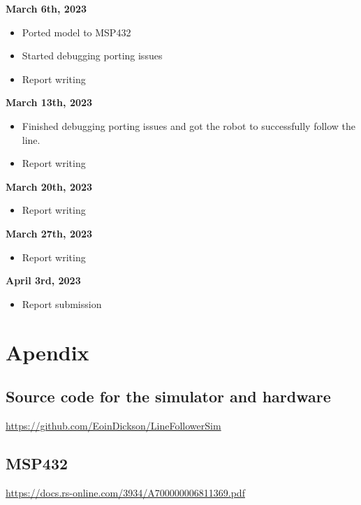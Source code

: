 \documentclass[a4paper,12pt]{article}
\begin{document}
\textbf{\large March 6th, 2023}
\begin{itemize}
  \item Ported model to MSP432 
  \item Started debugging porting issues
  \item Report writing 


\end{itemize}
\vspace{.7cm}
\textbf{\large March 13th, 2023}
\begin{itemize}
  \item Finished debugging porting issues and got the robot to successfully follow the line. 
  \item Report writing 

\end{itemize}
\vspace{.7cm}
\textbf{\large March 20th, 2023}
\begin{itemize}
  \item Report writing 


\end{itemize}
\vspace{.7cm}
\textbf{\large March 27th, 2023}
\begin{itemize}
  \item Report writing 


\end{itemize}
\vspace{.7cm}
\textbf{\large April 3rd, 2023}
\begin{itemize}
  \item Report submission 


\end{itemize}

\pagebreak
\section{Apendix}
\subsection{Source code for the simulator and hardware}
\url{https://github.com/EoinDickson/LineFollowerSim}
\subsection{MSP432}
\url{https://docs.rs-online.com/3934/A700000006811369.pdf}



\pagebreak
\printbibliography
\end{document}
